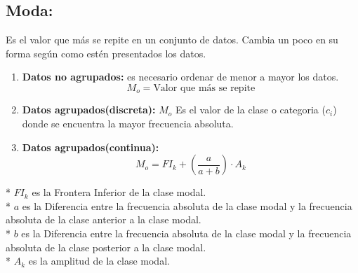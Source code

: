 \documentclass{templateNote}
\begin{document}
\subsection{Moda:}
Es el valor que más se repite en un conjunto de datos. Cambia un poco en su forma según
como estén presentados los datos.
\begin{enumerate}
    \item \textbf{Datos no agrupados:} es necesario ordenar de menor a mayor los datos.
    \begin{equation*}
        M_o = \textrm{Valor que más se repite}
    \end{equation*}
    \item \textbf{Datos agrupados(discreta):}
    $M_o$ Es el valor de la clase o categoria ($c_i$) donde se encuentra la mayor frecuencia absoluta.
    \item \textbf{Datos agrupados(continua):}
    \begin{equation*}
        M_o = FI_k + \left(\frac{a}{a + b}\right) \cdot A_k
    \end{equation*}
\end{enumerate}
* $FI_k$ es la Frontera Inferior de la clase modal.\\
* $a$ es la Diferencia entre la frecuencia absoluta de la clase modal y la frecuencia absoluta de la clase anterior a la clase modal.\\
* $b$ es la Diferencia entre la frecuencia absoluta de la clase modal y la frecuencia absoluta de la clase posterior a la clase modal.\\
* $A_k$ es la amplitud de la clase modal.\\
\end{document}
